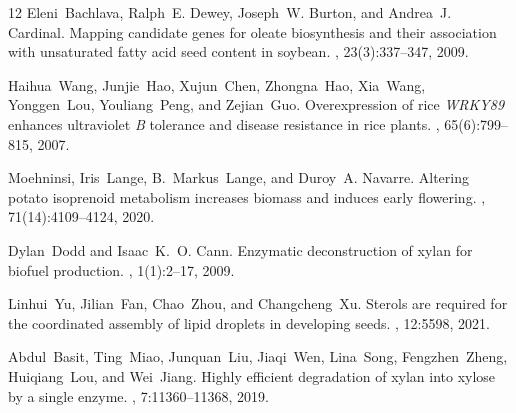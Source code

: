 \documentclass[unnumsec,webpdf,contemporary,large]{oup-authoring-template}%
\theoremstyle{thmstyleone}%
\theoremstyle{thmstyletwo}%
\theoremstyle{thmstylethree}%
\begin{document}
\begin{thebibliography}{12}
Eleni~Bachlava, Ralph~E. Dewey, Joseph~W. Burton, and Andrea~J. Cardinal.
\newblock Mapping candidate genes for oleate biosynthesis and their association with unsaturated fatty acid seed content in soybean.
, 23(3):337--347, 2009.

Haihua~Wang, Junjie~Hao, Xujun~Chen, Zhongna~Hao, Xia~Wang, Yonggen~Lou, Youliang~Peng, and Zejian~Guo.
\newblock Overexpression of rice \textit{WRKY89} enhances ultraviolet \textit{B} tolerance and disease resistance in rice plants.
, 65(6):799--815, 2007.

Moehninsi, Iris~Lange, B.~Markus~Lange, and Duroy~A. Navarre.
\newblock Altering potato isoprenoid metabolism increases biomass and induces early flowering.
, 71(14):4109--4124, 2020.

Dylan~Dodd and Isaac~K.~O. Cann.
\newblock Enzymatic deconstruction of xylan for biofuel production.
, 1(1):2--17, 2009.


Linhui~Yu, Jilian~Fan, Chao~Zhou, and Changcheng~Xu.
\newblock Sterols are required for the coordinated assembly of lipid droplets in developing seeds.
, 12:5598, 2021.

Abdul~Basit, Ting~Miao, Junquan~Liu, Jiaqi~Wen, Lina~Song, Fengzhen~Zheng, Huiqiang~Lou, and Wei~Jiang.
\newblock Highly efficient degradation of xylan into xylose by a single enzyme.
, 7:11360--11368, 2019.


\end{thebibliography}


\clearpage
\newpage
\end{document}
